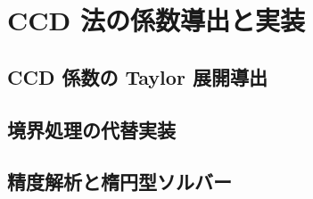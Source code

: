 %

\section{CCD 法の係数導出と実装}
\label{app:ccd_supplement}

\subsection{CCD 係数の Taylor 展開導出}
\label{app:ccd_coef_all}

\subsection{境界処理の代替実装}
\label{app:ccd_boundary_alt}

\subsection{精度解析と楕円型ソルバー}
\label{app:ccd_analysis}
